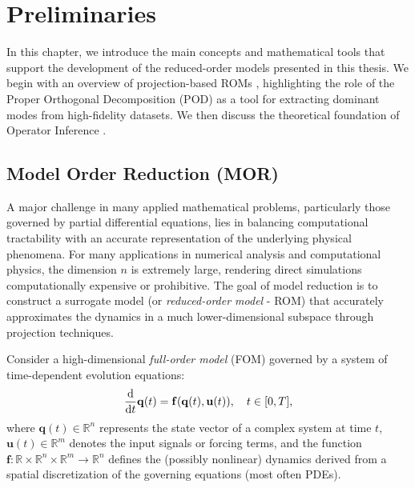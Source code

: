 \chapter{Preliminaries}
\label{chap:preliminar}

In this chapter, we introduce the main concepts and mathematical tools that support the development of the reduced-order models presented in this thesis. We begin with an overview of projection-based ROMs \cite{quarteroni2015reduced}, highlighting the role of the Proper Orthogonal Decomposition (POD) \cite{berkooz1993proper} as a tool for extracting dominant modes from high-fidelity datasets. We then discuss the theoretical foundation of Operator Inference \cite{opinf2025}.




\section{Model Order Reduction (MOR)}
\label{sec:roms}

A major challenge in many applied mathematical problems, particularly those governed by partial differential equations, lies in balancing computational tractability with an accurate representation of the underlying physical phenomena. For many applications in numerical analysis and computational physics, the dimension \(n\) is extremely large, rendering direct simulations computationally expensive or prohibitive. The goal of model reduction is to construct a surrogate model (or \textit{reduced-order model} - ROM) that accurately approximates the dynamics in a much lower-dimensional subspace through projection techniques.


Consider a high-dimensional \textit{full-order model} (FOM) governed by a system of time-dependent evolution equations:\\
\begin{equation}
    \dv{}{t}\mathbf{q}(t) = \mathbf{f}(\mathbf{q}(t), \mathbf{u}(t)), \quad t\in[0,T],
    \label{eq:fom}
\end{equation}
where $\mathbf{q}(t) \in \mathbb{R}^n$ represents the state vector of a complex system at time $t$, $\mathbf{u}(t) \in \mathbb{R}^m$ denotes the input signals or forcing terms, and the function $\mathbf{f}: \mathbb{R} \times \mathbb{R}^n \times \mathbb{R}^m \to \mathbb{R}^n$ defines the (possibly nonlinear) dynamics derived from a spatial discretization of the governing equations (most often PDEs).

